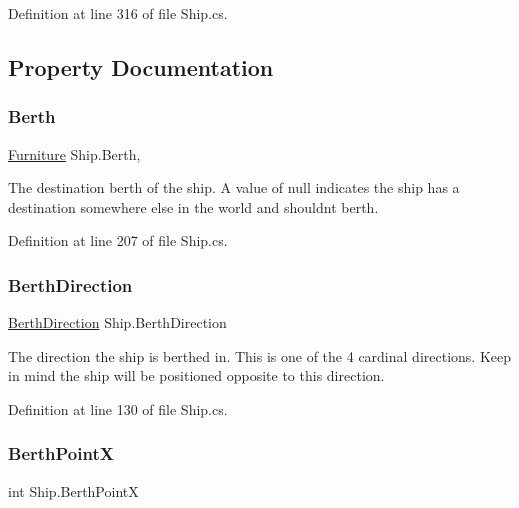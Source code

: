 Definition at line 316 of file Ship.\+cs.



\subsection{Property Documentation}
\mbox{\label{class_ship_ab8f3f2f2922059c0349d737b7dea5c13}} 
\subsubsection{\texorpdfstring{Berth}{Berth}}
{\footnotesize\ttfamily \hyperlink{class_furniture}{Furniture} Ship.\+Berth\hspace{0.3cm}{\ttfamily [get]}, {\ttfamily [set]}}



The destination berth of the ship. A value of null indicates the ship has a destination somewhere else in the world and shouldn\textquotesingle{}t berth. 



Definition at line 207 of file Ship.\+cs.

\mbox{\label{class_ship_a73af2744eb79135baee7ed389cc1b2c7}} 
\subsubsection{\texorpdfstring{Berth\+Direction}{BerthDirection}}
{\footnotesize\ttfamily \hyperlink{_ship_8cs_a7fa5743d14bde173fc53b46363f52a92}{Berth\+Direction} Ship.\+Berth\+Direction\hspace{0.3cm}{\ttfamily [get]}}



The direction the ship is berthed in. This is one of the 4 cardinal directions. Keep in mind the ship will be positioned opposite to this direction. 



Definition at line 130 of file Ship.\+cs.

\mbox{\label{class_ship_a701af608a2094d00e59888170afcc3ce}} 
\subsubsection{\texorpdfstring{Berth\+PointX}{BerthPointX}}
{\footnotesize\ttfamily int Ship.\+Berth\+PointX\hspace{0.3cm}{\ttfamily [get]}}



